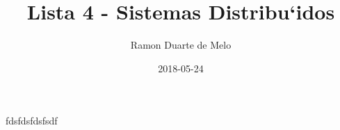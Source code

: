 \documentclass{uhhassignment}
\title{Lista 4 - Sistemas Distribu`idos}
\date{2018-05-24}
\author{Ramon Duarte de Melo}
\begin{document}
        \maketitle
        \newpage
         
        fdsfdsfdsfsdf
    
\end{document}
